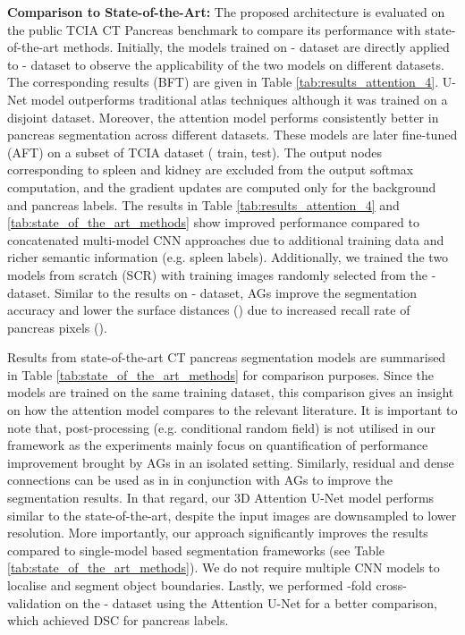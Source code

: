 \documentclass{article}
\begin{document}
\textbf{Comparison to State-of-the-Art:} The proposed architecture is evaluated on the public TCIA CT Pancreas benchmark to compare its performance with state-of-the-art methods. Initially, the models trained on - dataset are directly applied to - dataset to observe the applicability of the two models on different datasets. The corresponding results (BFT) are given in Table \ref{tab:results_attention_4}. U-Net model outperforms traditional atlas techniques \cite{wolz2013automated} although it was trained on a disjoint dataset. Moreover, the attention model performs consistently better in pancreas segmentation across different datasets. These models are later fine-tuned (AFT) on a subset of TCIA dataset ( train,  test). The output nodes corresponding to spleen and kidney are excluded from the output softmax computation, and the gradient updates are computed only for the background and pancreas labels. The results in Table \ref{tab:results_attention_4} and \ref{tab:state_of_the_art_methods} show improved performance compared to concatenated multi-model CNN approaches \cite{cai2017improving, roth2018media, zhou2017fixed} due to additional training data and richer semantic information (e.g. spleen labels). Additionally, we trained the two models from scratch (SCR) with  training images randomly selected from the - dataset. Similar to the results on - dataset, AGs improve the segmentation accuracy and lower the surface distances () due to increased recall rate of pancreas pixels  (). 

Results from state-of-the-art CT pancreas segmentation models are summarised in Table \ref{tab:state_of_the_art_methods} for comparison purposes. Since the models are trained on the same training dataset, this comparison gives an insight on how the attention model compares to the relevant literature. It is important to note that, post-processing (e.g. conditional random field) is not utilised in our framework as the experiments mainly focus on quantification of performance improvement brought by AGs in an isolated setting. Similarly, residual and dense connections can be used as in \cite{gibson2017towards} in conjunction with AGs to improve the segmentation results. In that regard, our 3D Attention U-Net model performs similar to the state-of-the-art, despite the input images are downsampled to lower resolution. More importantly, our approach significantly improves the results compared to single-model based segmentation frameworks (see Table \ref{tab:state_of_the_art_methods}). We do not require multiple CNN models to localise and segment object boundaries. Lastly, we performed -fold cross-validation on the - dataset using the Attention U-Net for a better comparison, which achieved  DSC for pancreas labels. 
\end{document}
